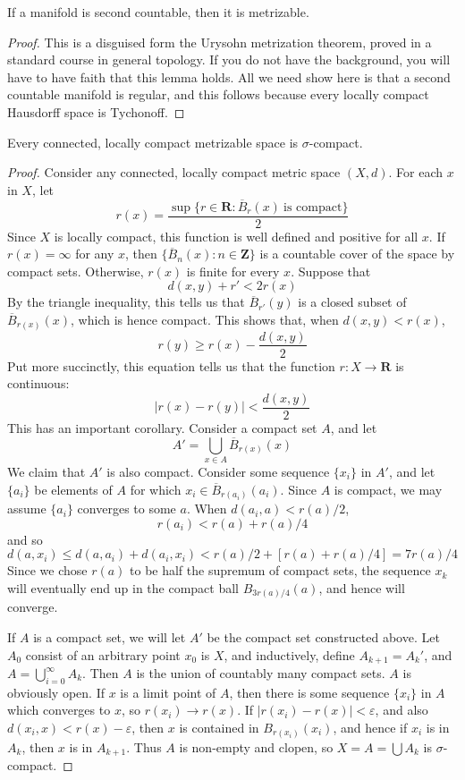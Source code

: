 \begin{lemma}[$2) \to (3$]
    If a manifold is second countable, then it is metrizable.
\end{lemma}
\begin{proof}
    This is a disguised form the Urysohn metrization theorem, proved in a standard course in general topology. If you do not have the background, you will have to have faith that this lemma holds. All we need show here is that a second countable manifold is regular, and this follows because every locally compact Hausdorff space is Tychonoff.
\end{proof}

\begin{lemma}[$3) \to (1$]
    Every connected, locally compact metrizable space is $\sigma$-compact.
\end{lemma}
\begin{proof}
    Consider any connected, locally compact metric space $(X,d)$. For each $x$ in $X$, let
    \[ r(x) = \frac{\sup \{ r \in \mathbf{R} : \overline{B}_r(x)\ \text{is compact} \}}{2} \]
    Since $X$ is locally compact, this function is well defined and positive for all $x$. If $r(x) = \infty$ for any $x$, then $\{ \overline{B}_n(x) : n \in \mathbf{Z} \}$ is a countable cover of the space by compact sets. Otherwise, $r(x)$ is finite for every $x$. Suppose that
    \[ d(x,y) + r' < 2r(x) \]
    By the triangle inequality, this tells us that $\overline{B}_{r'}(y)$ is a closed subset of $\overline{B}_{r(x)}(x)$, which is hence compact. This shows that, when $d(x,y) < r(x)$,
    \[ r(y) \geq r(x) - \frac{d(x,y)}{2} \]
    Put more succinctly, this equation tells us that the function $r:X \to \mathbf{R}$ is continuous:
    \[ |r(x) - r(y)| < \frac{d(x,y)}{2} \]
    This has an important corollary. Consider a compact set $A$, and let
    \[ A' = \bigcup_{x \in A} \overline{B}_{r(x)}(x) \]
    We claim that $A'$ is also compact. Consider some sequence $\{ x_i \}$ in $A'$, and let $\{ a_i \}$ be elements of $A$ for which $x_i \in \overline{B}_{r(a_i)}(a_i)$. Since $A$ is compact, we may assume $\{ a_i \}$ converges to some $a$. When $d(a_i, a) < r(a)/2$,
    \[ r(a_i) < r(a) + r(a)/4 \]
    and so
    \[ d(a,x_i) \leq d(a,a_i) + d(a_i,x_i) < r(a)/2 + [r(a) + r(a)/4] = 7r(a)/4 \]
    Since we chose $r(a)$ to be half the supremum of compact sets, the sequence $x_k$ will eventually end up in the compact ball $B_{3r(a)/4}(a)$, and hence will converge.

    If $A$ is a compact set, we will let $A'$ be the compact set constructed above. Let $A_0$ consist of an arbitrary point $x_0$ is $X$, and inductively, define $A_{k+1} = A_k'$, and $A = \bigcup_{i = 0}^\infty A_k$. Then $A$ is the union of countably many compact sets. $A$ is obviously open. If $x$ is a limit point of $A$, then there is some sequence $\{ x_i \}$ in $A$ which converges to $x$, so $r(x_i) \to r(x)$. If $|r(x_i) - r(x)| < \varepsilon$, and also $d(x_i,x) < r(x) - \varepsilon$, then $x$ is contained in $B_{r(x_i)}(x_i)$, and hence if $x_i$ is in $A_k$, then $x$ is in $A_{k+1}$. Thus $A$ is non-empty and clopen, so $X = A = \bigcup A_k$ is $\sigma$-compact.
\end{proof}

